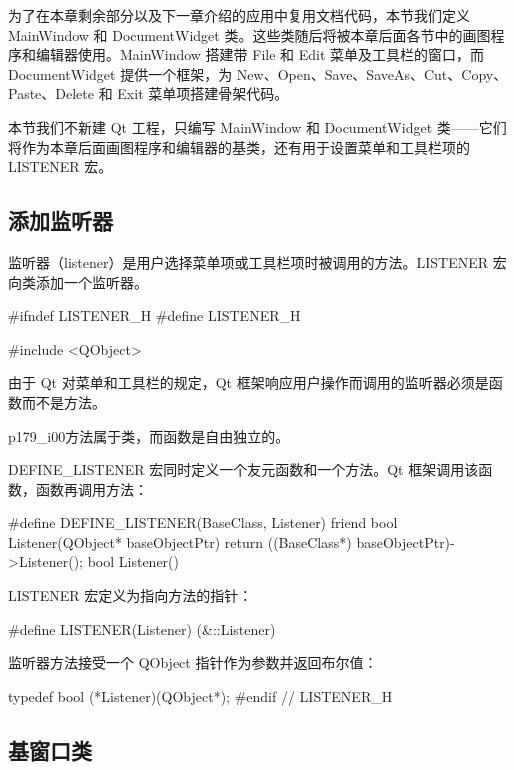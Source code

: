 为了在本章剩余部分以及下一章介绍的应用中复用文档代码，本节我们定义 MainWindow 和 DocumentWidget 类。这些类随后将被本章后面各节中的画图程序和编辑器使用。MainWindow 搭建带 File 和 Edit 菜单及工具栏的窗口，而 DocumentWidget 提供一个框架，为 New、Open、Save、SaveAs、Cut、Copy、Paste、Delete 和 Exit 菜单项搭建骨架代码。

本节我们不新建 Qt 工程，只编写 MainWindow 和 DocumentWidget 类——它们将作为本章后面画图程序和编辑器的基类，还有用于设置菜单和工具栏项的 LISTENER 宏。

\subsection{添加监听器}

监听器（listener）是用户选择菜单项或工具栏项时被调用的方法。LISTENER 宏向类添加一个监听器。

\medskip{}

\begin{codebox}
#ifndef LISTENER_H
#define LISTENER_H

#include <QObject>
\end{codebox}

由于 Qt 对菜单和工具栏的规定，Qt 框架响应用户操作而调用的监听器必须是函数而不是方法。

\begin{myNotic}{p179_i00}{方法属于类，而函数是自由独立的。}
\end{myNotic}

DEFINE\_LISTENER 宏同时定义一个友元函数和一个方法。Qt 框架调用该函数，函数再调用方法：

\begin{codebox}
#define DEFINE_LISTENER(BaseClass, Listener)
  friend bool Listener(QObject* baseObjectPtr) {
     return ((BaseClass*) baseObjectPtr)->Listener();
  }
  bool Listener()
\end{codebox}

LISTENER 宏定义为指向方法的指针：

\begin{codebox}
#define LISTENER(Listener) (&::Listener)
\end{codebox}

监听器方法接受一个 QObject 指针作为参数并返回布尔值：

\begin{codebox}
typedef bool (*Listener)(QObject*);
#endif // LISTENER_H
\end{codebox}

\subsection{基窗口类}

